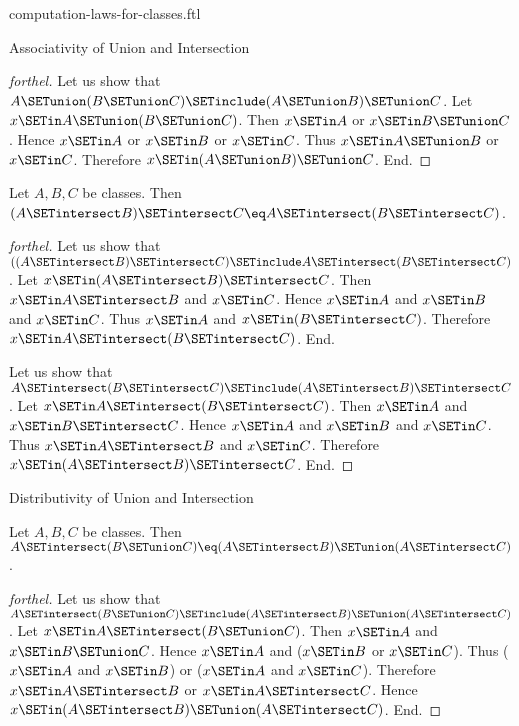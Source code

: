 \documentclass{naproche-library}
\begin{document}
\begin{smodule}[title=Computation Laws For Classes]{computation-laws-for-classes.ftl}
\begin{sfragment}{Associativity of Union and Intersection}
\begin{proof}[forthel]
    Let us show that $A \SETunion (B \SETunion C) \SETinclude (A \SETunion B) \SETunion C$.
      Let $x \SETin A \SETunion (B \SETunion C)$.
      Then $x \SETin A$ or $x \SETin B \SETunion C$.
      Hence $x \SETin A$ or $x \SETin B$ or $x \SETin C$.
      Thus $x \SETin A \SETunion B$ or $x \SETin C$.
      Therefore $x \SETin (A \SETunion B) \SETunion C$.
    End.
  \end{proof}

  \begin{proposition}[forthel,id=FOUNDATIONS_02_906751977193472]
    Let $A, B, C$ be classes.
    Then $(A \SETintersect B) \SETintersect C \eq A \SETintersect (B \SETintersect C)$.
  \end{proposition}
  \begin{proof}[forthel]
    Let us show that $((A \SETintersect B) \SETintersect C) \SETinclude A \SETintersect (B \SETintersect C)$. %
      Let $x \SETin (A \SETintersect B) \SETintersect C$.
      Then $x \SETin A \SETintersect B$ and $x \SETin C$.
      Hence $x \SETin A$ and $x \SETin B$ and $x \SETin C$.
      Thus $x \SETin A$ and $x \SETin (B \SETintersect C)$.
      Therefore$ x \SETin A \SETintersect (B \SETintersect C)$.
    End.

    Let us show that $A \SETintersect (B \SETintersect C) \SETinclude (A \SETintersect B) \SETintersect C$.
      Let $x \SETin A \SETintersect (B \SETintersect C)$.
      Then $x \SETin A$ and $x \SETin B \SETintersect C$.
      Hence $x \SETin A$ and $x \SETin B$ and $x \SETin C$.
      Thus $x \SETin A \SETintersect B$ and $x \SETin C$.
      Therefore $x \SETin (A \SETintersect B) \SETintersect C$.
    End.
  \end{proof}
\end{sfragment}

\begin{sfragment}{Distributivity of Union and Intersection}
  \begin{proposition}[forthel,id=FOUNDATIONS_02_371139087958016]
    Let $A, B, C$ be classes.
    Then $A \SETintersect (B \SETunion C) \eq (A \SETintersect B) \SETunion (A \SETintersect C)$.
  \end{proposition}
  \begin{proof}[forthel]
    Let us show that $A \SETintersect (B \SETunion C) \SETinclude (A \SETintersect B) \SETunion (A \SETintersect C)$.
      Let $x \SETin A \SETintersect (B \SETunion C)$.
      Then $x \SETin A$ and $x \SETin B \SETunion C$.
      Hence $x \SETin A$ and ($x \SETin B$ or $x \SETin C$).
      Thus ($x \SETin A$ and $x \SETin B$) or ($x \SETin A$ and $x \SETin C$).
      Therefore $x \SETin A \SETintersect B$ or $x \SETin A \SETintersect C$.
      Hence $x \SETin (A \SETintersect B) \SETunion (A \SETintersect C)$.
    End.


\end{proof}
\end{sfragment}
\end{smodule}
\end{document}
